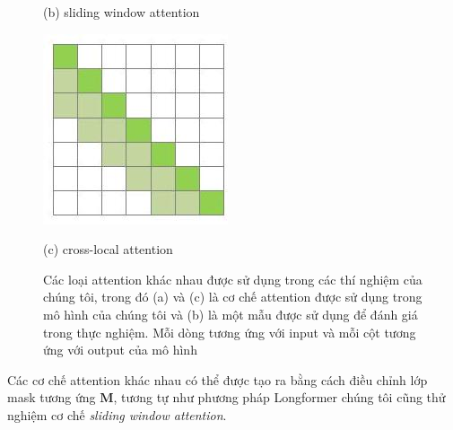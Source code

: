 \begin{figure}[ht]
\begin{minipage}[b]{0.25\textwidth}
    \caption*{(b) sliding window attention}
\end{minipage}
\hfill
\begin{minipage}[b]{0.25\textwidth}
\centering
    \includegraphics[width=\textwidth]{images/cross_attention.jpg}
    \caption*{(c) cross-local attention}
\end{minipage}
\caption[Các loại attention khác nhau (full self-attention, sliding window attention, cross-local attention)]{Các loại attention khác nhau được sử dụng trong các thí nghiệm của chúng tôi, trong đó (a) và (c) là cơ chế attention được sử dụng trong mô hình của chúng tôi và (b) là một mẫu được sử dụng để đánh giá trong thực nghiệm. Mỗi dòng tương ứng với input và mỗi cột tương ứng với output của mô hình}
\end{figure}



Các cơ chế attention khác nhau có thể được tạo ra bằng cách điều chỉnh lớp mask tương ứng $\mathbf{M}$, 
tương tự như phương pháp Longformer \cite{beltagy2020longformer} chúng tôi cũng thử nghiệm cơ chế \textit{sliding window attention}.

